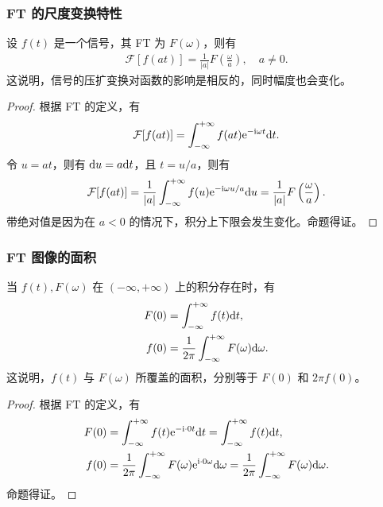 \subsubsection{FT 的尺度变换特性}

\begin{property}
    设 $f(t)$ 是一个信号，其 FT 为 $F(\omega)$，则有
    \begin{align*}
        \mathcal{F}[f(at)] = \frac{1}{|a|}F\left(\frac{\omega}{a}\right), \quad a \neq 0.
    \end{align*}
    这说明，信号的压扩变换对函数的影响是相反的，同时幅度也会变化。
\end{property}

\begin{proof}
    根据 FT 的定义，有
    \begin{align*}
        \mathcal{F}[f(at)] = \int_{-\infty}^{+\infty} f(at)\mathrm{e}^{-\mathrm{i}\omega t}\mathrm{d}t.
    \end{align*}
    令 $u = at$，则有 $\mathrm{d}u = a\mathrm{d}t$，且 $t = u/a$，则有
    \begin{align*}
        \mathcal{F}[f(at)] = \frac{1}{|a|}\int_{-\infty}^{+\infty} f(u)\mathrm{e}^{-\mathrm{i}\omega u/a}\mathrm{d}u = \frac{1}{|a|}F\left(\frac{\omega}{a}\right).
    \end{align*}
    带绝对值是因为在 $a < 0$ 的情况下，积分上下限会发生变化。命题得证。
\end{proof}

\subsubsection{FT 图像的面积}

\begin{property}
    当 $f(t), F(\omega)$ 在 $(-\infty, +\infty)$ 上的积分存在时，有
    \begin{align*}
        F(0) & = \int_{-\infty}^{+\infty} f(t)\mathrm{d}t, \\
        f(0) & = \frac{1}{2\pi}\int_{-\infty}^{+\infty} F(\omega)\mathrm{d}\omega.
    \end{align*}
    这说明，$f(t)$ 与 $F(\omega)$ 所覆盖的面积，分别等于 $F(0)$ 和 $2\pi f(0)$。
\end{property}

\begin{proof}
    根据 FT 的定义，有
    \begin{align*}
        F(0) & = \int_{-\infty}^{+\infty} f(t)\mathrm{e}^{-\mathrm{i}\cdot 0 t}\mathrm{d}t = \int_{-\infty}^{+\infty} f(t)\mathrm{d}t, \\
        f(0) & = \frac{1}{2\pi}\int_{-\infty}^{+\infty} F(\omega)\mathrm{e}^{\mathrm{i}\cdot 0 \omega}\mathrm{d}\omega = \frac{1}{2\pi}\int_{-\infty}^{+\infty} F(\omega)\mathrm{d}\omega.
    \end{align*}
    命题得证。
\end{proof}

